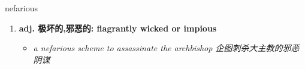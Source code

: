 
\begin{frame}
{\huge nefarious}
\begin{center}
\begin{enumerate}\Large
  \item \textbf{adj. 极坏的,邪恶的: flagrantly wicked or impious}
  \begin{itemize}
    \item \em{\Large{a nefarious scheme to assassinate the archbishop 企图刺杀大主教的邪恶阴谋}}
  \end{itemize}
\end{enumerate}
\end{center}
\end{frame}
